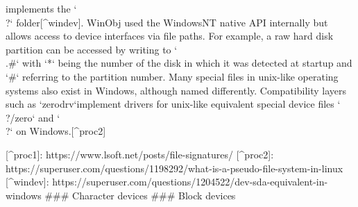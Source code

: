 implements the `\\?\Device` folder[^windev]. WinObj used the WindowsNT native API internally but allows access to device interfaces
via file paths. For example, a raw hard disk partition can be accessed by writing to `\\.\Device\Harddisk*\partition#`
with `*` being the number of the disk in which it was detected at startup and `#` referring to the partition number.
Many special files in unix-like operating systems also exist in Windows, although named differently. Compatibility layers
such as `zerodrv`implement drivers for unix-like equivalent special device files `\\?\Device/zero` and `\\?\Devices\null`
on Windows.[^proc2]

[^proc1]: https://www.lsoft.net/posts/file-signatures/
[^proc2]: https://superuser.com/questions/1198292/what-is-a-pseudo-file-system-in-linux
[^windev]: https://superuser.com/questions/1204522/dev-sda-equivalent-in-windows
### Character devices
### Block devices

